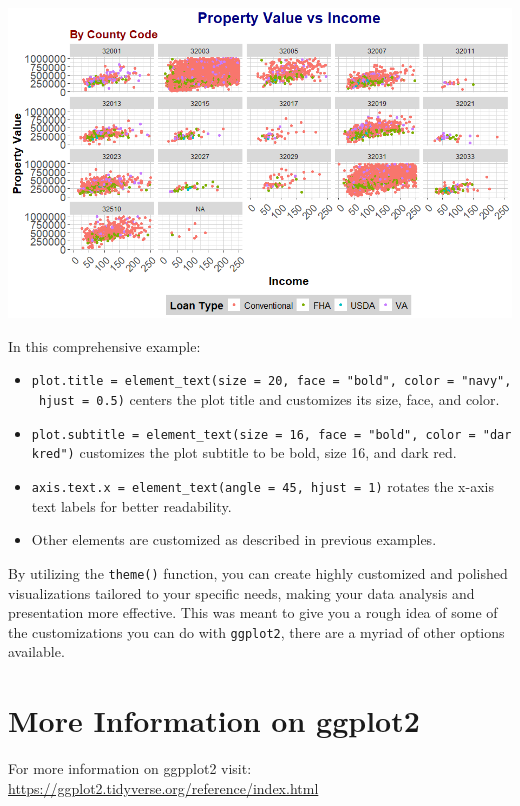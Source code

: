 \documentclass[
]{book}
\begin{document}
\includegraphics{images/custom_theme_4.PNG}

In this comprehensive example:

\begin{itemize}
\item
  \texttt{plot.title\ =\ element\_text(size\ =\ 20,\ face\ =\ "bold",\ color\ =\ "navy",\ hjust\ =\ 0.5)} centers the plot title and customizes its size, face, and color.
\item
  \texttt{plot.subtitle\ =\ element\_text(size\ =\ 16,\ face\ =\ "bold",\ color\ =\ "darkred")} customizes the plot subtitle to be bold, size 16, and dark red.
\item
  \texttt{axis.text.x\ =\ element\_text(angle\ =\ 45,\ hjust\ =\ 1)} rotates the x-axis text labels for better readability.
\item
  Other elements are customized as described in previous examples.
\end{itemize}

By utilizing the \texttt{theme()} function, you can create highly customized and polished visualizations tailored to your specific needs, making your data analysis and presentation more effective. This was meant to give you a rough idea of some of the customizations you can do with \texttt{ggplot2}, there are a myriad of other options available.

\hypertarget{more-information-on-ggplot2}{%
\section*{More Information on ggplot2}\label{more-information-on-ggplot2}}

For more information on ggpplot2 visit: \url{https://ggplot2.tidyverse.org/reference/index.html}
\end{document}
